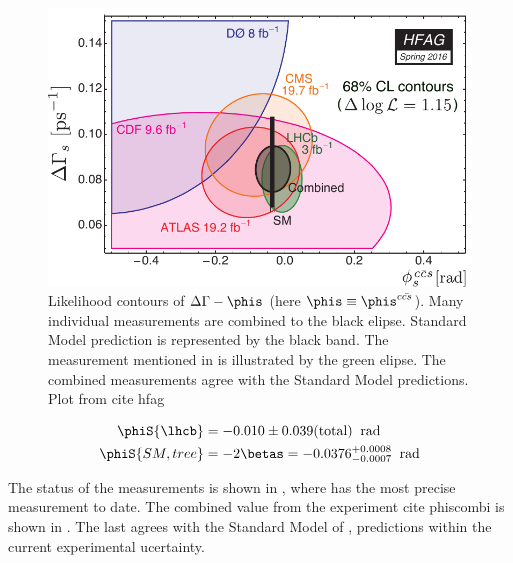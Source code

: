 \begin{figure}[h]
  \begin{center}
    \includegraphics[trim=0cm 0cm 0cm 0cm, clip=true, scale=0.8]{Figures/Chapter1/hfag_Spring2016_DGsphis_zoom.pdf}
    \caption{Likelihood contours of $\Delta\Gamma-\phis$ (here $\phis\equiv \phis^{c\bar{cs}}$). Many individual measurements are
             combined to the black elipse. Standard Model prediction is represented by the black band. The \lhcb measurement
             mentioned in \equref{} is illustrated by the green elipse. The combined measurements agree with the Standard Model
             predictions. Plot from \cite{HFAG} {\color{red} cite hfag} }
    \label{hfag_phis_dg}
  \end{center}
\end{figure}

\begin{subequations}
  \begin{align}
  \centering
  \phiS{\lhcb}           &=  -0.010 \pm 0.039(\text{total})  \;\; \text{rad}
  \label{phis_lhcb} \\
  \phiS{SM,tree}  &=  -2\betas = -0.0376 {}^{+0.0008}_{-0.0007}  \;\; \text{rad}
  \label{phis_theo}
\end{align}
\end{subequations}

The status of the \phis measurements is shown in , where \lhcb has the most precise measurement to date.
The combined \phis value from the \lhcb experiment {\color{red} cite phiscombi} is shown in .
The last agrees with the Standard Model of , predictions within the current experimental ucertainty.

